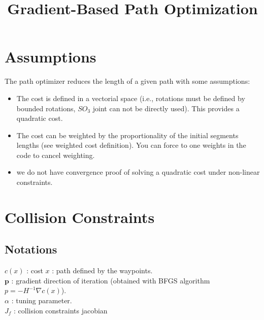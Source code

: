 \documentclass {article}
\title {Gradient-Based Path Optimization}
\begin{document}
\maketitle

\tableofcontents

\newpage

\section{Assumptions}

The path optimizer reduces the length of a given path with some assumptions:
\begin{itemize}
\item The cost is defined in a vectorial space (i.e., rotations must be defined by bounded rotations, $SO_3$ joint can not be directly used). This provides a quadratic cost.

\item The cost can be weighted by the proportionality of the initial segments lengths (see weighted cost definition). You can force to one weights in the code to cancel weighting.

\item we do not have convergence proof of solving a quadratic cost under non-linear constraints.

\end{itemize}



\newpage

\section{Collision Constraints}
\subsection{Notations}
$c(x)$ : cost
$x$ : path defined by the waypoints. \\
$\mathbf{p}$ : gradient direction of iteration (obtained with BFGS algorithm
$p = -H^{-1}\nabla c(x)$). \\
$\alpha$ : tuning parameter. \\
$J_f$ : collision constraints jacobian
\end{document}
